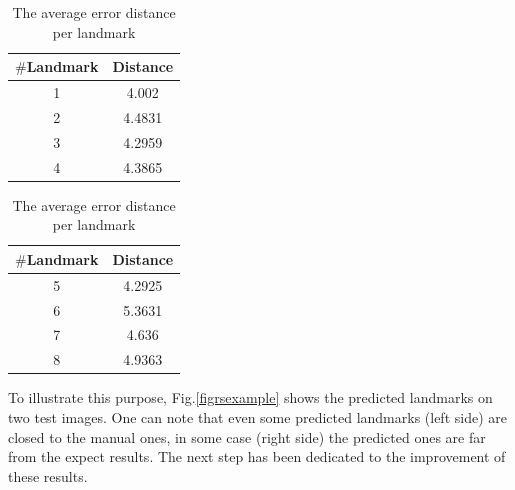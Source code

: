 \documentclass[10pt]{article}
\begin{document}
\begin{table}[h!]
	\begin{subtable}{.22\linewidth}
	\centering
	\begin{tabular}{|c|c| }
	\hline
	\textbf{$\#$Landmark} & \textbf{Distance} \\ \hline
	1 & 4.002  \\ \hline
	2 & 4.4831 \\ \hline
	3 & 4.2959 \\ \hline
	4 & 4.3865 \\ \hline
	
	\end{tabular}
	\end{subtable}%
	\hspace{2.5cm}
	\begin{subtable}{.2\linewidth}
	\centering
	\begin{tabular}{|c|c| }
	\hline
	\textbf{$\#$Landmark} & \textbf{Distance} \\ \hline
	5 & 4.2925 \\ \hline
	6 & 5.3631 \\ \hline
	7 & 4.636 \\ \hline
	8 & 4.9363 \\ \hline
	\end{tabular}
	\end{subtable}
	\caption{\small{The average error distance per landmark}}
	\label{tabledistance}
\end{table}

To illustrate this purpose, Fig.\ref{figrsexample} shows the predicted landmarks on two test
images. One can note that even some predicted landmarks (left side)
are closed to the manual ones, in some case (right side) the predicted
ones are far from the expect results. The next step has been dedicated
to the improvement of these results.
\end{document}
